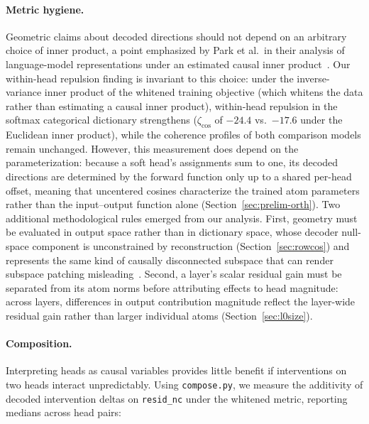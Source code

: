 \paragraph{Metric hygiene.}
Geometric claims about decoded directions should not depend on an
arbitrary choice of inner product, a point emphasized by Park et al.\ in
their analysis of language-model representations under an estimated
causal inner product~\cite{park2025}. Our within-head repulsion finding
is invariant to this choice: under the inverse-variance inner product of
the whitened training objective (which whitens the data rather than
estimating a causal inner product), within-head repulsion in the softmax
categorical dictionary strengthens ($\zeta_{\cos}$ of $-24.4$ vs.\ $-17.6$
under the Euclidean inner product), while the coherence profiles of both
comparison models remain unchanged. However, this measurement does depend on the
parameterization: because a soft head's assignments sum to one, its
decoded directions are determined by the forward function only up to a
shared per-head offset, meaning that uncentered cosines characterize the
trained atom parameters rather than the input--output function alone
(Section~\ref{sec:prelim-orth}). Two additional methodological rules
emerged from our analysis. First, geometry must be evaluated in output
space rather than in dictionary space, whose decoder null-space component
is unconstrained by reconstruction (Section~\ref{sec:rowcos}) and
represents the same kind of causally disconnected subspace that can
render subspace patching misleading~\cite{makelov2023}. Second, a layer's
scalar residual gain must be separated from its atom norms before
attributing effects to head magnitude: across layers, differences in
output contribution magnitude reflect the layer-wide residual gain rather
than larger individual atoms (Section~\ref{sec:l0size}).

\paragraph{Composition.}
Interpreting heads as causal variables provides little benefit if
interventions on two heads interact unpredictably. Using
\texttt{compose.py}, we measure the additivity of decoded intervention
deltas on \texttt{resid\_nc} under the whitened metric, reporting medians
across head pairs:

